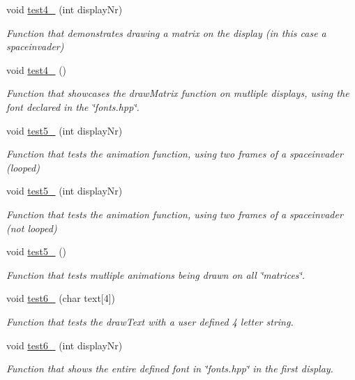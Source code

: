 \begin{DoxyCompactItemize}
void \hyperlink{classexamples_a9f6adb558bc1c910e0fe5e8d6cdf6939}{test4\+\_} (int display\+Nr)
\begin{DoxyCompactList}\small\item\em Function that demonstrates drawing a matrix on the display (in this case a spaceinvader) \end{DoxyCompactList}\item 
\mbox{\label{classexamples_aea8039bb0b719a7c85406cf0c59e209d}} 
void \hyperlink{classexamples_aea8039bb0b719a7c85406cf0c59e209d}{test4\+\_} ()
\begin{DoxyCompactList}\small\item\em Function that showcases the draw\+Matrix function on mutliple displays, using the font declared in the \char`\"{}fonts.\+hpp\char`\"{}. \end{DoxyCompactList}\item 
void \hyperlink{classexamples_af65b32278bcfc8eb30064ebd0a2469f7}{test5\+\_} (int display\+Nr)
\begin{DoxyCompactList}\small\item\em Function that tests the animation function, using two frames of a spaceinvader (looped) \end{DoxyCompactList}\item 
void \hyperlink{classexamples_a2951eb3130ebea1ef3d0f14fbf45f390}{test5\+\_} (int display\+Nr)
\begin{DoxyCompactList}\small\item\em Function that tests the animation function, using two frames of a spaceinvader (not looped) \end{DoxyCompactList}\item 
\mbox{\label{classexamples_a8a7ba2c6ca54be07e834b7be00667a93}} 
void \hyperlink{classexamples_a8a7ba2c6ca54be07e834b7be00667a93}{test5\+\_} ()
\begin{DoxyCompactList}\small\item\em Function that tests mutliple animations being drawn on all \char`\"{}matrices\char`\"{}. \end{DoxyCompactList}\item 
void \hyperlink{classexamples_a4c4f7520f26e56fd26956c021ba6413a}{test6\+\_} (char text\mbox{[}4\mbox{]})
\begin{DoxyCompactList}\small\item\em Function that tests the draw\+Text with a user defined 4 letter string. \end{DoxyCompactList}\item 
void \hyperlink{classexamples_adea3697b47cb512e3355fc78fa522b91}{test6\+\_} (int display\+Nr)
\begin{DoxyCompactList}\small\item\em Function that shows the entire defined font in \char`\"{}fonts.\+hpp\char`\"{} in the first display. \end{DoxyCompactList}\end{DoxyCompactItemize}


